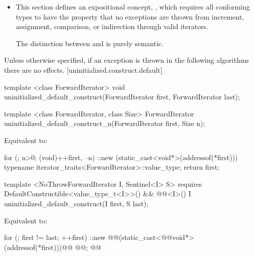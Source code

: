 {\color{addclr}
\setcounter{subparagraph}{0}
\begin{itemize}
\item This section defines an expositional concept, , which requires all
conforming types to have the property that no exceptions are thrown from increment, assignment, comparison, or
indirection through valid iterators.

\enternote
The distinction between  and  is purely semantic.
\exitnote
\end{itemize}
} %

Unless otherwise specified, if an exception is thrown in the following algorithms there are no effects.
[uninitialized.construct.default]{}
{\color{remclr}
\begin{codeblock}
template <class ForwardIterator>
  void uninitialized_default_construct(ForwardIterator first, ForwardIterator last);
\end{codeblock}

\begin{codeblock}
template <class ForwardIterator, class Size>
  ForwardIterator uninitialized_default_construct_n(ForwardIterator first, Size n);
\end{codeblock}

\setcounter{Paras}{1}
\pnum
\effects Equivalent to:
\begin{codeblock}
        for (; n>0; (void)++first, --n)
          ::new (static_cast<void*>(addressof(*first)))
            typename iterator_traits<ForwardIterator>::value_type;
        return first;
\end{codeblock}
} %

{\color{addclr}
\begin{codeblock}
template <NoThrowForwardIterator I, Sentinel<I> S>
  requires DefaultConstructible<value_type_t<I>>() &&
           @@<I>()
    I uninitialized_default_construct(I first, S last);
\end{codeblock}
} %

\setcounter{Paras}{0}
\pnum
\effects Equivalent to:
\begin{codeblock}
        for (; first != last; ++first)
          ::new @@(static_cast<@@void*>(addressof(*first)))@\added{)}@
            @@;
        @@
\end{codeblock}

